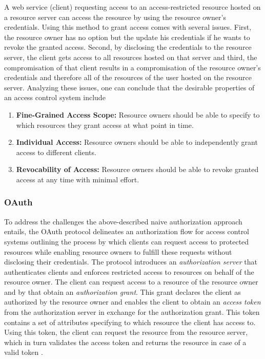 \documentclass[conference]{IEEEtran}
\begin{document}
A web service (client) requesting access to an access-restricted resource hosted on a resource server can access the resource by using the resource owner's credentials.
Using this method to grant access comes with several issues.
First, the resource owner has no option but the update his credentials if he wants to revoke the granted access.
Second, by disclosing the credentials to the resource server, the client gets access to all resources hosted on that server and third, the compromisation of that client results in a compromisation of the resource owner's credentials and therefore all of the resources of the user hosted on the resource server.
Analyzing these issues, one can conclude that the desirable properties of an access control system include

\begin{enumerate}
  \item \textbf{Fine-Grained Access Scope:} Resource owners should be able to specify to which resources they grant access at what point in time.
  \item \textbf{Individual Access:} Resource owners should be able to independently grant access to different clients.
  \item \textbf{Revocability of Access:} Resource owners should be able to revoke granted access at any time with minimal effort.
\end{enumerate}

\subsubsection*{OAuth}
To address the challenges the above-described naive authorization approach entails, the OAuth protocol delineates an authorization flow for access control systems outlining the process by which clients can request access to protected resources while enabling resource owners to fulfill these requests without disclosing their credentials.
The protocol introduces an \textit{authorization server} that authenticates clients and enforces restricted access to resources on behalf of the resource owner.
The client can request access to a resource of the resource owner and by that obtain an \textit{authorization grant}.
This grant declares the client as authorized by the resource owner and enables the client to obtain an \textit{access token} from the authorization server in exchange for the authorization grant.
This token contains a set of attributes specifying to which resource the client has access to.
Using this token, the client can request the resource from the resource server, which in turn validates the access token and returns the resource in case of a valid token \cite{hardt_oauth_2012}.
\end{document}
